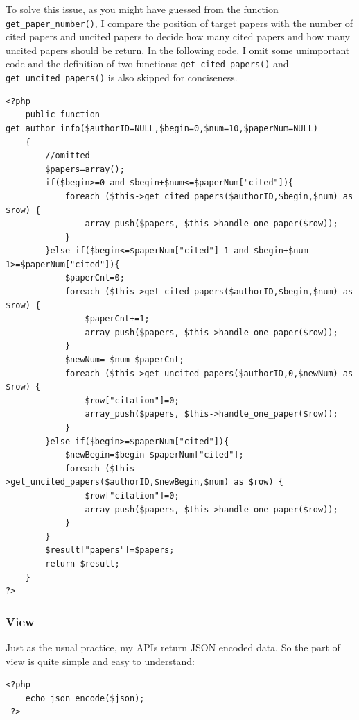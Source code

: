 \documentclass[a4paper]{article}
\begin{document}
To solve this issue, as you might have guessed from the function \texttt{get_paper_number()}, I compare the position of target papers with the number of cited papers and uncited papers to decide how many cited papers and how many uncited papers should be return. In the following code, I omit some unimportant code and the definition of two functions: \texttt{get_cited_papers()} and \texttt{get_uncited_papers()} is also skipped for conciseness.
\begin{verbatim}
<?php
    public function get_author_info($authorID=NULL,$begin=0,$num=10,$paperNum=NULL)
    {
        //omitted
        $papers=array();
        if($begin>=0 and $begin+$num<=$paperNum["cited"]){
            foreach ($this->get_cited_papers($authorID,$begin,$num) as $row) {
                array_push($papers, $this->handle_one_paper($row));
            }
        }else if($begin<=$paperNum["cited"]-1 and $begin+$num-1>=$paperNum["cited"]){
            $paperCnt=0;
            foreach ($this->get_cited_papers($authorID,$begin,$num) as $row) {
                $paperCnt+=1;
                array_push($papers, $this->handle_one_paper($row));
            }
            $newNum= $num-$paperCnt;
            foreach ($this->get_uncited_papers($authorID,0,$newNum) as $row) {
                $row["citation"]=0;
                array_push($papers, $this->handle_one_paper($row));
            }            
        }else if($begin>=$paperNum["cited"]){
            $newBegin=$begin-$paperNum["cited"];
            foreach ($this->get_uncited_papers($authorID,$newBegin,$num) as $row) {
                $row["citation"]=0;
                array_push($papers, $this->handle_one_paper($row));
            }
        }
        $result["papers"]=$papers;
        return $result;
    }
?>
\end{verbatim}
            \subsubsection{View}
Just as the usual practice, my APIs return JSON encoded data. So the part of view is quite simple and easy to understand:
\begin{verbatim}
<?php 
    echo json_encode($json);
 ?>
\end{verbatim}
\end{document}
